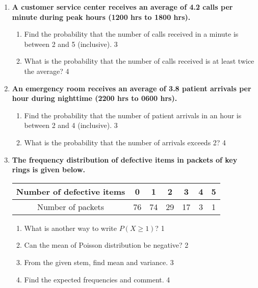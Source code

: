 \documentclass[a4paper,oneside, margin=1.4in]{book}
\begin{document}
\begin{enumerate}
  \item  
  \textbf{A customer service center receives an average of 4.2 calls per minute during peak hours (1200 hrs to 1800 hrs).}  

  \begin{enumerate}  
    \item  
      Find the probability that the number of calls received in a minute is between 2 and 5 (inclusive). \hfill 3  
    \item  
      What is the probability that the number of calls received is at least twice the average? \hfill 4  
  \end{enumerate}  

\item  
  \textbf{An emergency room receives an average of 3.8 patient arrivals per hour during nighttime (2200 hrs to 0600 hrs).}  

  \begin{enumerate}  
    \item  
      Find the probability that the number of patient arrivals in an hour is between 2 and 4 (inclusive). \hfill 3  
    \item  
      What is the probability that the number of arrivals exceeds 2? \hfill 4  
  \end{enumerate}  

  
     \item
	  \textbf{The frequency distribution of defective items in packets of key rings is given below.} 
	  
	  \begin{table}[h]
	  \centering
\begin{tabular}{c|c|c|c|c|c|c}
Number of defective items & 0 & 1 & 2 & 3 & 4 & 5 \\ \hline
Number of packets & 76 & 74 & 29 & 17 & 3 & 1
\end{tabular}
\end{table}
  
  \begin{enumerate}
    \item
	What is another way to write $P(X \ge 1)$? \hfill 1
    \item
	Can the mean of Poisson distribution be negative? \hfill 2
    \item  
	From the given stem, find mean and variance. \hfill 3
    \item
	Find the expected frequencies and comment. \hfill 4
  \end{enumerate}
  

\end{enumerate}
\end{document}
